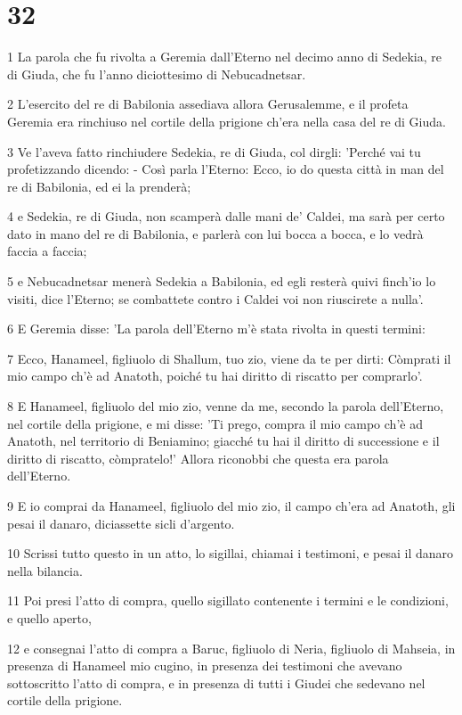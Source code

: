 \chapter{32}

\par 1 La parola che fu rivolta a Geremia dall'Eterno nel decimo anno di Sedekia, re di Giuda, che fu l'anno diciottesimo di Nebucadnetsar.
\par 2 L'esercito del re di Babilonia assediava allora Gerusalemme, e il profeta Geremia era rinchiuso nel cortile della prigione ch'era nella casa del re di Giuda.
\par 3 Ve l'aveva fatto rinchiudere Sedekia, re di Giuda, col dirgli: 'Perché vai tu profetizzando dicendo: - Così parla l'Eterno: Ecco, io do questa città in man del re di Babilonia, ed ei la prenderà;
\par 4 e Sedekia, re di Giuda, non scamperà dalle mani de' Caldei, ma sarà per certo dato in mano del re di Babilonia, e parlerà con lui bocca a bocca, e lo vedrà faccia a faccia;
\par 5 e Nebucadnetsar menerà Sedekia a Babilonia, ed egli resterà quivi finch'io lo visiti, dice l'Eterno; se combattete contro i Caldei voi non riuscirete a nulla'.
\par 6 E Geremia disse: 'La parola dell'Eterno m'è stata rivolta in questi termini:
\par 7 Ecco, Hanameel, figliuolo di Shallum, tuo zio, viene da te per dirti: Còmprati il mio campo ch'è ad Anatoth, poiché tu hai diritto di riscatto per comprarlo'.
\par 8 E Hanameel, figliuolo del mio zio, venne da me, secondo la parola dell'Eterno, nel cortile della prigione, e mi disse: 'Ti prego, compra il mio campo ch'è ad Anatoth, nel territorio di Beniamino; giacché tu hai il diritto di successione e il diritto di riscatto, còmpratelo!' Allora riconobbi che questa era parola dell'Eterno.
\par 9 E io comprai da Hanameel, figliuolo del mio zio, il campo ch'era ad Anatoth, gli pesai il danaro, diciassette sicli d'argento.
\par 10 Scrissi tutto questo in un atto, lo sigillai, chiamai i testimoni, e pesai il danaro nella bilancia.
\par 11 Poi presi l'atto di compra, quello sigillato contenente i termini e le condizioni, e quello aperto,
\par 12 e consegnai l'atto di compra a Baruc, figliuolo di Neria, figliuolo di Mahseia, in presenza di Hanameel mio cugino, in presenza dei testimoni che avevano sottoscritto l'atto di compra, e in presenza di tutti i Giudei che sedevano nel cortile della prigione.
